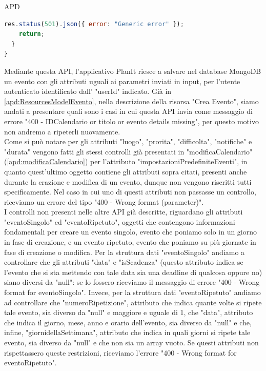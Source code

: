 \begin{listaPersonale} {APD}
\begin{listaPersonale2}[APD]{}
\begin{lstlisting}[language=JavaScript]
    res.status(501).json({ error: "Generic error" });
    return;
  }
}
            \end{lstlisting}
                \newpage
                Mediante questa API, l'applicativo PlanIt riesce a salvare nel database MongoDB un evento con gli attributi uguali ai parametri inviati in input, per l'utente autenticato identificato dall' "userId" indicato. Già in \ref{apd:ResourcesModelEvento}, nella descrizione della risorsa "Crea Evento", siamo andati a presentare quali sono i casi in cui questa API invia come messaggio di errore "400 - IDCalendario or titolo or evento details missing", per questo motivo non andremo a ripeterli nuovamente. \\
                Come si può notare per gli attributi "luogo", "prorita", "difficolta", "notifiche" e "durata" vengono fatti gli stessi controlli già presentati in "modificaCalendario" (\ref{apd:modificaCalendario}) per l'attributo "impostazioniPredefiniteEventi", in quanto quest'ultimo oggetto contiene gli attributi sopra citati, presenti anche durante la crazione e modifica di un evento, dunque non vengono riscritti tutti specificamente. Nel caso in cui uno di questi attributi non passasse un controllo, riceviamo un errore del tipo "400 - Wrong format (parameter)". \\
                I controlli non presenti nelle altre API già descritte, riguardano gli attributi "eventoSingolo" ed "eventoRipetuto", oggetti che contengono informazioni fondamentali per creare un evento singolo, evento che poniamo solo in un giorno in fase di creazione, e un evento ripetuto, evento che poniamo su più giornate in fase di creazione o modifica. Per la struttura dati "eventoSingolo" andiamo a controllare che gli attributi "data" e "isScadenza" (questo attributo indica se l'evento che si sta mettendo con tale data sia una deadline di qualcosa oppure no) siano diversi da "null": se lo fossero riceviamo il messaggio di errore "400 - Wrong format for eventoSingolo".  Invece, per la struttura dati "eventoRipetuto" andiamo ad controllare che "numeroRipetizione", attributo che indica quante volte si ripete tale evento, sia diverso da "null" e maggiore e uguale di 1, che "data", attributo che indica il giorno, mese, anno e orario dell'evento, sia diverso da "null" e che, infine, "giornidellaSettimana", attributo che indica in quali giorni si ripete tale evento, sia diverso da "null" e che non sia un array vuoto. Se questi attributi non rispettassero queste restrizioni, riceviamo l'errore "400 - Wrong format for eventoRipetuto". \\

\end{listaPersonale2}
\end{listaPersonale}
